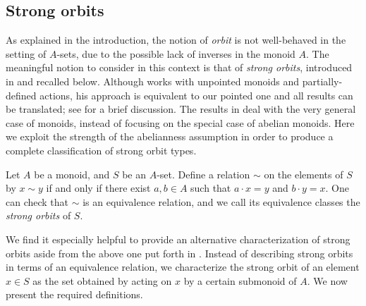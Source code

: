 \documentclass[11pt]{amsart}
\begin{document}




\subsection{Strong orbits}\label{subsec:ambits}

As explained in the introduction, the notion of \emph{orbit} is not well-behaved in the setting of $A$-sets, due to the possible lack of inverses in the monoid $A$. %
The meaningful notion to consider in this context is that of \emph{strong orbits}, introduced in \cite[Section 2.3.3]{burnside} and recalled below. Although \cite{burnside} works with unpointed monoids and partially-defined actions, his approach is equivalent to our pointed one and all results can be translated; see \cite[Section 1.7]{burnside} for a brief discussion.  The results in \cite{burnside} %
deal with the very general case of monoids, instead of focusing on the special case of abelian monoids.  Here we exploit the strength of the abelianness assumption in order to produce a complete classification of strong orbit types. 
 
 \begin{definition}\label{defn.strongorbit}
 Let $A$ be a monoid, and $S$  be an $A$-set.   Define a relation $\sim$ on the elements of  $S$ by $x\sim y$ if and only if
there exist $a,b\in A$ such that $a\cdot x=y$ and $b\cdot y=x$. One can check that $\sim$ is an equivalence relation, and we call its
equivalence classes the \emph{strong orbits} of $S$.
\end{definition}

We find it especially helpful to provide an alternative characterization of strong orbits aside from the above one put forth in \cite{burnside}. Instead of describing strong orbits in terms of an equivalence relation, we characterize the strong orbit of an element $x\in S$ as the set obtained by acting on $x$ by a certain submonoid of $A$. We now present the required definitions.
\end{document}
